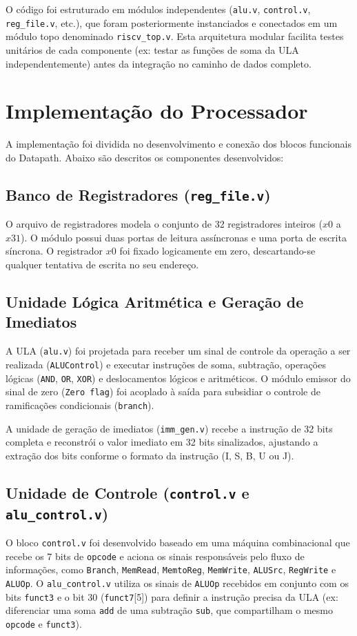 \documentclass[conference]{IEEEtran}
\begin{document}
O código foi estruturado em módulos independentes (\texttt{alu.v}, \texttt{control.v}, \texttt{reg\_file.v}, etc.), que foram posteriormente instanciados e conectados em um módulo topo denominado \texttt{riscv\_top.v}. Esta arquitetura modular facilita testes unitários de cada componente (ex: testar as funções de soma da ULA independentemente) antes da integração no caminho de dados completo. 

\section{Implementação do Processador}

A implementação foi dividida no desenvolvimento e conexão dos blocos funcionais do Datapath. Abaixo são descritos os componentes desenvolvidos:

\subsection{Banco de Registradores (\texttt{reg\_file.v})}
O arquivo de registradores modela o conjunto de 32 registradores inteiros ($x0$ a $x31$). O módulo possui duas portas de leitura assíncronas e uma porta de escrita síncrona. O registrador $x0$ foi fixado logicamente em zero, descartando-se qualquer tentativa de escrita no seu endereço. 

\subsection{Unidade Lógica Aritmética e Geração de Imediatos}
A ULA (\texttt{alu.v}) foi projetada para receber um sinal de controle da operação a ser realizada (\texttt{ALUControl}) e executar instruções de soma, subtração, operações lógicas (\texttt{AND}, \texttt{OR}, \texttt{XOR}) e deslocamentos lógicos e aritméticos. O módulo emissor do sinal de zero (\texttt{Zero flag}) foi acoplado à saída para subsidiar o controle de ramificações condicionais (\texttt{branch}).

A unidade de geração de imediatos (\texttt{imm\_gen.v}) recebe a instrução de 32 bits completa e reconstrói o valor imediato em 32 bits sinalizados, ajustando a extração dos bits conforme o formato da instrução (I, S, B, U ou J).

\subsection{Unidade de Controle (\texttt{control.v} e \texttt{alu\_control.v})}
O bloco \texttt{control.v} foi desenvolvido baseado em uma máquina combinacional que recebe os 7 bits de \texttt{opcode} e aciona os sinais responsáveis pelo fluxo de informações, como \texttt{Branch}, \texttt{MemRead}, \texttt{MemtoReg}, \texttt{MemWrite}, \texttt{ALUSrc}, \texttt{RegWrite} e \texttt{ALUOp}. O \texttt{alu\_control.v} utiliza os sinais de \texttt{ALUOp} recebidos em conjunto com os bits \texttt{funct3} e o bit 30 (\texttt{funct7}[5]) para definir a instrução precisa da ULA (ex: diferenciar uma soma \texttt{add} de uma subtração \texttt{sub}, que compartilham o mesmo \texttt{opcode} e \texttt{funct3}).
\end{document}
